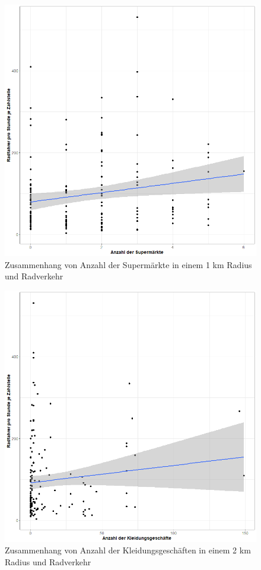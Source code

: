 \documentclass[a4paper,12pt]{thesis}
\begin{document}
\begin{figure}[!ht]
	\centering
	\includegraphics[width=\textwidth]{Plots/plot14.png}
	\caption{Zusammenhang von Anzahl der Supermärkte in einem 1 km Radius und Radverkehr}
	\label{SuperMarket}
\end{figure}

\begin{figure}[!ht]
	\centering
	\includegraphics[width=\textwidth]{Plots/plot15.png}
	\caption{Zusammenhang von Anzahl der Kleidungsgeschäften in einem 2 km Radius und Radverkehr}
	\label{ClothesShop}
\end{figure}
\end{document}
